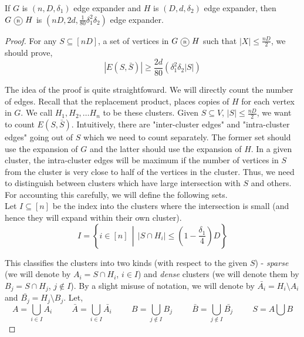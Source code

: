 \begin{theorem}
\label{thm:combinatorial-rp}
If $G$ is $(n,D,\delta_1)$ edge expander and $H$ is $(D,d,\delta_2)$ edge expander, then $G \circled{R} H$ is $(nD,2d,\frac{1}{80}\delta_1^2\delta_2)$ edge expander.
\end{theorem}
\begin{proof}
For any $S \subseteq [nD]$, a set of vertices in $G \circled{R} H$ such that $|X| \le \frac{nD}{2}$, we should prove, 
$$\left|E(S,\bar{S})\right| \ge \frac{2d}{80}\left(\delta_1^2\delta_2|S|\right)$$

\noindent The idea of the proof is quite straightfoward. We will directly count the number of edges. Recall that the replacement product, places copies of $H$ for each vertex in $G$. We call $H_1, H_2, \ldots H_n$ to be these clusters. 
Given $S \subseteq V$, $|S| \le \frac{nD}{2}$, we want to count $E(S,\bar{S})$. Intuitively, there are "inter-cluster edges" and "intra-cluster edges" going out of $S$ which we need to count separately. The former set should use the expansion of $G$ and the latter should use the expansion of $H$. In a given cluster, the intra-cluster edges will be maximum if the number of vertices in $S$ from the cluster is very close to half of the vertices in the cluster. Thus, we need to distinguish between clusters which have large intersection with $S$ and others. For accounting this carefully, we will define the following sets.\\

\noindent Let $I \subseteq [n]$ be the index into the clusters where the intersection is small (and hence they will expand within their own cluster).
$$I = \left\{ i \in [n] ~~\left| ~~|S \cap H_i| \le \left(1-\frac{\delta_1}{4}\right)D \right. \right\}
$$

This classifies the clusters into two kinds (with respect to the given $S$) - \textit{sparse} (we will denote by $A_i = S \cap H_i$, $i \in I$) and \textit{dense} clusters (we will denote them by $B_j = S \cap H_j$, $j \notin I$). By a slight misuse of notation, we will denote by $\bar{A_i} = H_i\setminus A_i$ and $\bar{B_j} = H_j\setminus B_j$. Let,
$$A = \bigcup_{i \in I} A_i \hspace{1cm} \bar{A} = \bigcup_{i \in I} \bar{A_i} \hspace{1cm} B = \bigcup_{j \notin I} B_j \hspace{1cm} \bar{B} = \bigcup_{j \notin I} \bar{B_j} \hspace{1cm} S = A \bigcup B$$


\end{proof}
